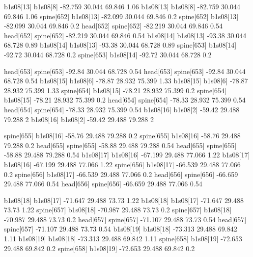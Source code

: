 b1s08[13]    b1s08[8]    -82.759    30.044    69.846    1.06
b1s08[13]    b1s08[8]    -82.759    30.044    69.846    1.06
spine[652]    b1s08[13]    -82.099    30.044    69.846    0.2
spine[652]    b1s08[13]    -82.099    30.044    69.846    0.2
head[652]    spine[652]    -82.219    30.044    69.846    0.54
head[652]    spine[652]    -82.219    30.044    69.846    0.54
b1s08[14]    b1s08[13]    -93.38    30.044    68.728    0.89
b1s08[14]    b1s08[13]    -93.38    30.044    68.728    0.89
spine[653]    b1s08[14]    -92.72    30.044    68.728    0.2
spine[653]    b1s08[14]    -92.72    30.044    68.728    0.2


head[653]    spine[653]    -92.84    30.044    68.728    0.54
head[653]    spine[653]    -92.84    30.044    68.728    0.54
b1s08[15]    b1s08[6]    -78.87    28.932    75.399    1.33
b1s08[15]    b1s08[6]    -78.87    28.932    75.399    1.33
spine[654]    b1s08[15]    -78.21    28.932    75.399    0.2
spine[654]    b1s08[15]    -78.21    28.932    75.399    0.2
head[654]    spine[654]    -78.33    28.932    75.399    0.54
head[654]    spine[654]    -78.33    28.932    75.399    0.54
b1s08[16]    b1s08[2]    -59.42    29.488    79.288    2
b1s08[16]    b1s08[2]    -59.42    29.488    79.288    2


spine[655]    b1s08[16]    -58.76    29.488    79.288    0.2
spine[655]    b1s08[16]    -58.76    29.488    79.288    0.2
head[655]    spine[655]    -58.88    29.488    79.288    0.54
head[655]    spine[655]    -58.88    29.488    79.288    0.54
b1s08[17]    b1s08[16]    -67.199    29.488    77.066    1.22
b1s08[17]    b1s08[16]    -67.199    29.488    77.066    1.22
spine[656]    b1s08[17]    -66.539    29.488    77.066    0.2
spine[656]    b1s08[17]    -66.539    29.488    77.066    0.2
head[656]    spine[656]    -66.659    29.488    77.066    0.54
head[656]    spine[656]    -66.659    29.488    77.066    0.54


b1s08[18]    b1s08[17]    -71.647    29.488    73.73    1.22
b1s08[18]    b1s08[17]    -71.647    29.488    73.73    1.22
spine[657]    b1s08[18]    -70.987    29.488    73.73    0.2
spine[657]    b1s08[18]    -70.987    29.488    73.73    0.2
head[657]    spine[657]    -71.107    29.488    73.73    0.54
head[657]    spine[657]    -71.107    29.488    73.73    0.54
b1s08[19]    b1s08[18]    -73.313    29.488    69.842    1.11
b1s08[19]    b1s08[18]    -73.313    29.488    69.842    1.11
spine[658]    b1s08[19]    -72.653    29.488    69.842    0.2
spine[658]    b1s08[19]    -72.653    29.488    69.842    0.2


